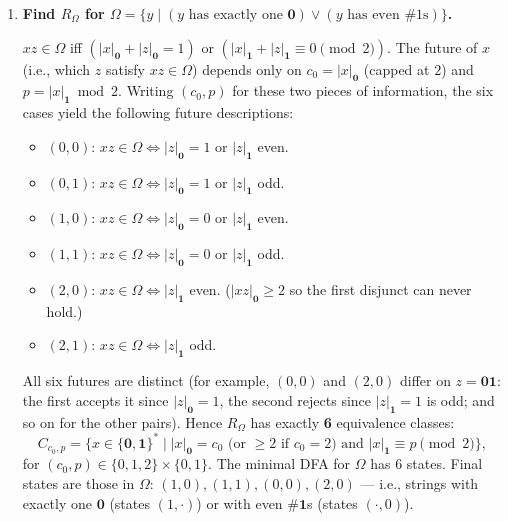 \begin{enumerate}[{2.}1.]
\begin{enumerate}
\item The other languages $L$ that still give this same $R_L$ are exactly:
\[
C_0\cup C_3,\quad C_1\cup C_3,\quad C_0\cup C_1\cup C_3,
\]
\[
C_2\cup C_4,\quad C_0\cup C_2\cup C_4,\quad C_1\cup C_2\cup C_4,\quad C_0\cup C_1\cup C_2\cup C_4.
\]
Together with part (a), there are 8 such languages.
\end{enumerate}

\item \textbf{Find $R_\Omega$ for $\Omega=\{y\mid(y\text{ has exactly one }\mathbf{0})\vee(y\text{ has even \#1s})\}$.}

$xz\in\Omega$ iff $(|x|_\mathbf{0}+|z|_\mathbf{0}=1)$ or $(|x|_\mathbf{1}+|z|_\mathbf{1}\equiv 0\pmod 2)$.
The future of $x$ (i.e., which $z$ satisfy $xz\in\Omega$) depends only on $c_0=|x|_\mathbf{0}$ (capped at $2$) and $p=|x|_\mathbf{1}\bmod 2$.
Writing $(c_0,p)$ for these two pieces of information, the six cases yield the following future descriptions:

\begin{itemize}
\item $(0,0)$: $xz\in\Omega\Leftrightarrow |z|_\mathbf{0}=1$ or $|z|_\mathbf{1}$ even.
\item $(0,1)$: $xz\in\Omega\Leftrightarrow |z|_\mathbf{0}=1$ or $|z|_\mathbf{1}$ odd.
\item $(1,0)$: $xz\in\Omega\Leftrightarrow |z|_\mathbf{0}=0$ or $|z|_\mathbf{1}$ even.
\item $(1,1)$: $xz\in\Omega\Leftrightarrow |z|_\mathbf{0}=0$ or $|z|_\mathbf{1}$ odd.
\item $(2,0)$: $xz\in\Omega\Leftrightarrow |z|_\mathbf{1}$ even. \quad ($|xz|_\mathbf{0}\geq 2$ so the first disjunct can never hold.)
\item $(2,1)$: $xz\in\Omega\Leftrightarrow |z|_\mathbf{1}$ odd.
\end{itemize}

All six futures are distinct (for example, $(0,0)$ and $(2,0)$ differ on $z=\mathbf{01}$: the first accepts it since $|z|_\mathbf{0}=1$, the second rejects since $|z|_\mathbf{1}=1$ is odd; and so on for the other pairs). Hence $R_\Omega$ has exactly \textbf{6} equivalence classes:
\[
C_{c_0,p}=\{x\in\{\mathbf{0},\mathbf{1}\}^*\mid |x|_\mathbf{0}=c_0\text{ (or }\geq 2\text{ if }c_0=2)\text{ and }|x|_\mathbf{1}\equiv p\pmod 2\},
\]
for $(c_0,p)\in\{0,1,2\}\times\{0,1\}$.
The minimal DFA for $\Omega$ has 6 states. Final states are those in $\Omega$: $(1,0),(1,1),(0,0),(2,0)$ — i.e., strings with exactly one $\mathbf{0}$ (states $(1,\cdot)$) or with even \#$\mathbf{1}$s (states $(\cdot,0)$).


\end{enumerate}
